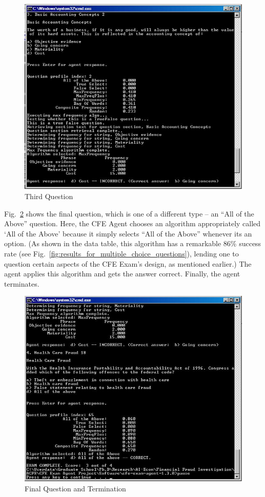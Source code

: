 \begin{figure}
\centering
\includegraphics[scale=0.75]{screen_shot_6.jpg}
\caption{Third Question}
\label{fig:third_question}
\end{figure}

Fig.~\ref{fig:final_question_and_termination} shows the final question, which is one of a different type -- an ``All of the Above'' question.  Here, the CFE Agent chooses an algorithm appropriately called `All of the Above' because it simply selects ``All of the Above'' whenever its an option.  (As shown in the data table, this algorithm has a remarkable 86\% success rate (see Fig.~\ref{fig:results_for_multiple_choice_questions}), lending one to question certain aspects of the CFE Exam’s design, as mentioned earlier.)  The agent applies this algorithm and gets the answer correct.  Finally, the agent terminates.

\begin{figure}
\centering
\includegraphics[scale=0.75]{screen_shot_7.jpg}
\caption{Final Question and Termination}
\label{fig:final_question_and_termination}
\end{figure}


